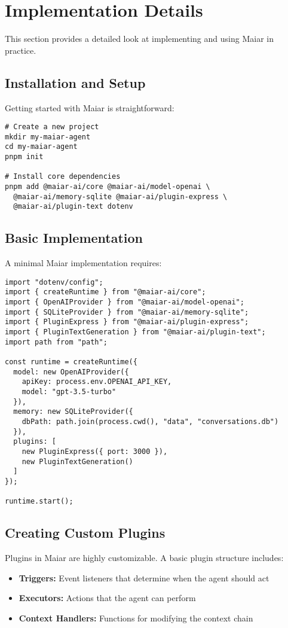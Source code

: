 \documentclass[12pt]{article}
\begin{document}
\section{Implementation Details}
This section provides a detailed look at implementing and using Maiar in practice.

\subsection{Installation and Setup}
Getting started with Maiar is straightforward:

\begin{verbatim}
# Create a new project
mkdir my-maiar-agent
cd my-maiar-agent
pnpm init

# Install core dependencies
pnpm add @maiar-ai/core @maiar-ai/model-openai \
  @maiar-ai/memory-sqlite @maiar-ai/plugin-express \
  @maiar-ai/plugin-text dotenv
\end{verbatim}

\subsection{Basic Implementation}
A minimal Maiar implementation requires:

\begin{verbatim}
import "dotenv/config";
import { createRuntime } from "@maiar-ai/core";
import { OpenAIProvider } from "@maiar-ai/model-openai";
import { SQLiteProvider } from "@maiar-ai/memory-sqlite";
import { PluginExpress } from "@maiar-ai/plugin-express";
import { PluginTextGeneration } from "@maiar-ai/plugin-text";
import path from "path";

const runtime = createRuntime({
  model: new OpenAIProvider({
    apiKey: process.env.OPENAI_API_KEY,
    model: "gpt-3.5-turbo"
  }),
  memory: new SQLiteProvider({
    dbPath: path.join(process.cwd(), "data", "conversations.db")
  }),
  plugins: [
    new PluginExpress({ port: 3000 }),
    new PluginTextGeneration()
  ]
});

runtime.start();
\end{verbatim}

\subsection{Creating Custom Plugins}
Plugins in Maiar are highly customizable. A basic plugin structure includes:

\begin{itemize}
    \item \textbf{Triggers:} Event listeners that determine when the agent should act
    \item \textbf{Executors:} Actions that the agent can perform
    \item \textbf{Context Handlers:} Functions for modifying the context chain
\end{itemize}
\end{document}
